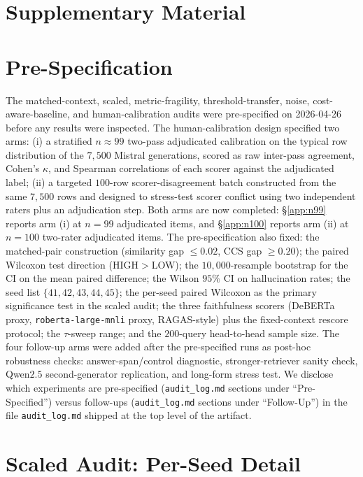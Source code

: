 \section*{Supplementary Material}

\section{Pre-Specification}
\label{app:prespec}

The matched-context, scaled, metric-fragility, threshold-transfer,
noise, cost-aware-baseline, and human-calibration audits were
pre-specified on 2026-04-26 before any results were inspected. The
human-calibration design specified two arms: (i) a stratified
$n{\approx}99$ two-pass adjudicated calibration on the typical row
distribution of the $7{,}500$ Mistral generations, scored as raw
inter-pass agreement, Cohen's $\kappa$, and Spearman correlations of
each scorer against the adjudicated label; (ii) a targeted $100$-row
scorer-disagreement batch constructed from the same $7{,}500$ rows and
designed to stress-test scorer conflict using two independent raters
plus an adjudication step. Both arms are now completed:
\S\ref{app:n99} reports arm (i) at $n=99$ adjudicated
items, and \S\ref{app:n100} reports arm (ii) at $n=100$
two-rater adjudicated items. The pre-specification also fixed: the
matched-pair construction (similarity gap $\leq 0.02$, CCS gap
$\geq 0.20$); the paired Wilcoxon test direction (HIGH$>$LOW); the
$10{,}000$-resample bootstrap for the CI on the mean paired
difference; the Wilson $95\%$ CI on hallucination rates; the seed list
$\{41, 42, 43, 44, 45\}$; the per-seed paired Wilcoxon as the primary
significance test in the scaled audit; the three faithfulness scorers
(DeBERTa proxy, \texttt{roberta-large-mnli} proxy, RAGAS-style) plus
the fixed-context rescore protocol; the $\tau$-sweep range; and the
$200$-query head-to-head sample size. The four follow-up arms were
added after the pre-specified runs as post-hoc robustness checks:
answer-span/control diagnostic, stronger-retriever sanity check,
Qwen$2.5$ second-generator replication, and long-form stress test. We
disclose which experiments are pre-specified
(\texttt{audit\_log.md} sections under ``Pre-Specified'') versus
follow-ups (\texttt{audit\_log.md} sections under ``Follow-Up'') in
the file \texttt{audit\_log.md} shipped at the top level of the
artifact.

\section{Scaled Audit: Per-Seed Detail}
\label{app:per_seed}

